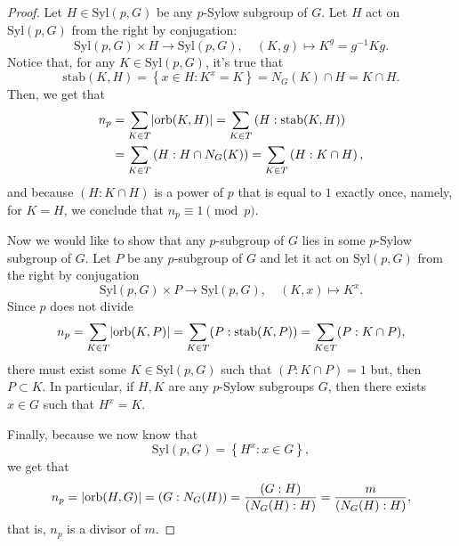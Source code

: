 \begin{proof}
  Let \({H}\in{\text{Syl}(p,G)}\) be any \(p\)-Sylow subgroup of \(G\). Let \(H\) act on \(\text{Syl}(p,G)\) from the right by conjugation:
  \[
    \text{Syl}(p,G)\times{H}\to{\text{Syl}(p,G)},
    \quad
    (K,g)\mapsto{K^{g}=g^{-1}Kg}.
  \]
  Notice that, for any \({K}\in{\text{Syl}(p,G)}\), it's true that
  \[
    \text{stab}(K,H)
    =
    \left\{{x}\in{H}:K^{x}=K\right\}
    =
    N_{G}(K)\cap{H}
    =
    K\cap{H}
    .
  \]
  Then, we get that
  \begin{align*}
    n_{p}
    &=
    \sum_{{K}\in{T}}\lvert\text{orb}(K,H)\rvert
    =
    \sum_{{K}\in{T}}\left(H:\text{stab}(K,H)\right)
    \\
    &=
    \sum_{{K}\in{T}}\left(H:H\cap{N_{G}(K)}\right)
    =
    \sum_{{K}\in{T}}\left(H:K\cap{H}\right)
    ,
  \end{align*}
  and because \(\left(H:K\cap{H}\right)\) is a power of \(p\) that is equal to
  \(1\) exactly once, namely, for \(K=H\), we conclude that
  \(n_{p}\equiv{1}\pmod{p}\).

  Now we would like to show that any \(p\)-subgroup of \(G\) lies in some \(p\)-Sylow subgroup of \(G\). Let \(P\) be any \(p\)-subgroup of \(G\) and let it act on \(\text{Syl}(p,G)\) from the right by conjugation
  \[
    \text{Syl}(p,G)\times{P}\to{\text{Syl}(p,G)},
    \quad
    (K,x)\mapsto{K^{x}}
    .
  \]
  Since \(p\) does not divide
  \[
    n_{p}
    =
    \sum_{{K}\in{T}}\lvert\text{orb}(K,P)\rvert
    =
    \sum_{{K}\in{T}}(P:\text{stab}(K,P))
    =
    \sum_{{K}\in{T}}(P:K\cap{P})
    ,
  \]
  there must exist some \({K}\in{\text{Syl}(p,G)}\) such that \((P:K\cap{P})=1\) but, then \({P}\subset{K}\). In particular, if \(H,K\) are any \(p\)-Sylow subgroups \(G\), then there exists \({x}\in{G}\) such that \(H^{x}=K\).

  Finally, because we now know that
  \[
    \text{Syl}(p,G)
    =
    \left\{H^{x}:{x}\in{G}\right\}
    ,
  \]
  we get that
  \[
    n_{p}
    =
    \lvert\text{orb}(H,G)\rvert
    =
    (G:N_{G}(H))
    =
    \frac{(G:H)}{(N_{G}(H):H)}
    =
    \frac{m}{(N_{G}(H):H)}
    ,
  \]
  that is, \(n_{p}\) is a divisor of \(m\).
\end{proof}

